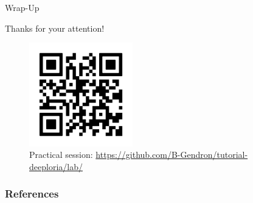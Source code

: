 \documentclass[11pt,aspectratio=169]{beamer}
\begin{document}
\begin{frame}{Wrap-Up}
    
\end{frame}

\begin{frame}[plain]
    \begin{center}
        \vspace{0.5cm}
        {\color{roose}\Huge Thanks for your attention!}
        
        \vspace{0.3cm}
        
        \begin{figure}[h]
            \centering
            \includegraphics[width=0.4\textwidth]{qr_code.png}
            \caption{\centering Practical session: \url{https://github.com/B-Gendron/tutorial-deeploria/lab/}}
        \end{figure}
    \end{center}
\end{frame}

\begin{frame}
    \frametitle{References}
    \printbibliography
\end{frame}

\end{document}
